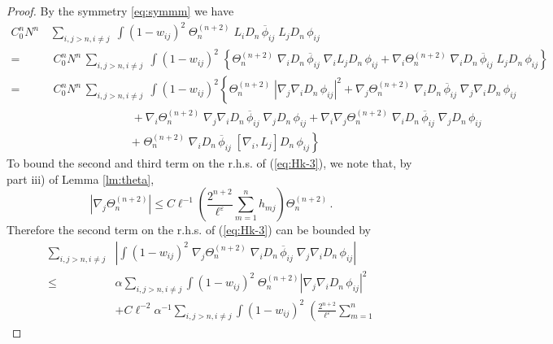 \documentclass[11pt]{article}
\newcommand{\eps}{\varepsilon}
\renewcommand{\a}{\alpha}
\begin{document}
\begin{proof}
 By the symmetry \eqref{eq:symmm} we have
\begin{equation}\label{eq:Hk-3}
\begin{split}
C_0^n N^n \, &\sum_{i,j > n, i\neq j} \; \int (1-w_{ij})^2 \;
\Theta^{(n+2)}_n \; L_i D_n \,\overline{\phi}_{ij} \; L_j D_n \,
\phi_{ij}
\\ = & \; C_0^n N^n \, \sum_{i,j > n, i\neq j} \; \int (1-w_{ij})^2
\; \left\{ \Theta^{(n+2)}_n \; \nabla_i D_n \,\overline{\phi}_{ij}
\; \nabla_i L_j D_n \, \phi_{ij} + \nabla_i \Theta^{(n+2)}_n \;
\nabla_i D_n \,\overline{\phi}_{ij} \; L_j D_n \, \phi_{ij} \right\}
\\ = & \; C_0^n N^n \, \sum_{i,j > n, i\neq j} \; \int
(1-w_{ij})^2 \left\{ \Theta^{(n+2)}_n \; |\nabla_j \nabla_i D_n
\,\phi_{ij}|^2 + \nabla_j \Theta^{(n+2)}_n  \; \nabla_i D_n
\,\overline{\phi}_{ij} \; \nabla_j \nabla_i D_n \, \phi_{ij} \right.
\\&\hspace{3cm}+ \nabla_i \Theta^{(n+2)}_n  \; \nabla_j \nabla_i D_n \,
\overline{\phi}_{ij} \; \nabla_j D_n \, \phi_{ij} + \nabla_i
\nabla_j \Theta^{(n+2)}_n \; \nabla_i D_n \,\overline{\phi}_{ij} \;
\nabla_j D_n \, \phi_{ij}
\\ &\hspace{3cm}\left.
+ \; \Theta^{(n+2)}_n \; \nabla_i D_n \,\overline{\phi}_{ij} \;
[\nabla_i, L_j ] D_n \, \phi_{ij} \right\}
\end{split}
\end{equation}
To bound the second and third term on the r.h.s. of (\ref{eq:Hk-3}),
we note that, by part iii) of Lemma \ref{lm:theta},
\begin{equation}\label{eq:nablatheta}
\left| \nabla_j \Theta^{(n+2)}_n  \right| \leq C \ell^{-1} \left(
\frac{2^{n+2}}{\ell^{\eps}} \sum_{m=1}^n h_{mj} \right)
\Theta^{(n+2)}_n \, .
\end{equation}
Therefore the second term on the r.h.s. of (\ref{eq:Hk-3}) can be
bounded by
\begin{equation}\label{eq:Hk-4}
\begin{split}
\sum_{i,j > n, i\neq j} &\left| \int (1-w_{ij})^2 \; \nabla_j
\Theta^{(n+2)}_n  \; \nabla_i D_n \,\overline{\phi}_{ij} \; \nabla_j
\nabla_i D_n \, \phi_{ij}\right| \\ \leq \; & \a \sum_{i,j >n, i
\neq j} \int (1-w_{ij})^2 \; \Theta^{(n+2)}_n |\nabla_j \nabla_i D_n
\, \phi_{ij}|^2 \\ &+ C \ell^{-2} \a^{-1} \sum_{i,j >n, i \neq j}
\int (1-w_{ij})^2 \; \left( \frac{2^{n+2}}{\ell^{\eps}} \sum_{m=1}^n

\end{split}
\end{equation}
\end{proof}
\end{document}

